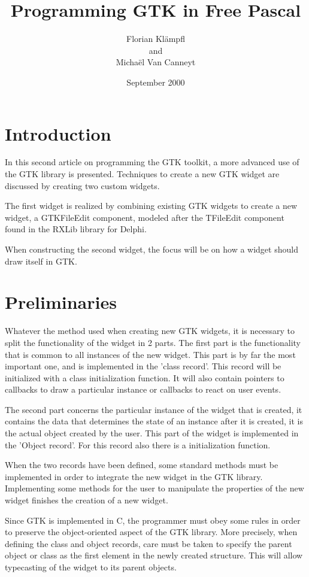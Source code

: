 \documentclass[10pt]{article}
\begin{document}
\title{Programming GTK in Free Pascal}
\author{Florian Kl\"ampfl\\and\\Micha\"el Van Canneyt}
\date{September 2000}
\maketitle
\section{Introduction}
In this second article on programming the GTK toolkit, a more advanced use
of the GTK library is presented. Techniques to create a new GTK widget
are discussed by creating two custom widgets. 

The first widget is realized by combining existing GTK widgets to create 
a new widget, a GTKFileEdit component, modeled after the TFileEdit component
found in the RXLib library for Delphi.

When constructing the second widget, the focus will be on how a widget
should draw itself in GTK.

\section{Preliminaries}
Whatever the method used when creating new GTK widgets, it is necessary to 
split the functionality of the widget in 2 parts. 
The first part is the functionality that is common to all instances of the 
new widget. This part is by far the most important one, and is implemented 
in the 'class record'. This record will be initialized with a class 
initialization function. It will also contain pointers to callbacks to
draw a particular instance or callbacks to react on user events.

The second part concerns the particular instance of the widget that is 
created, it contains the data that determines the state of an instance
after it is created, it is the actual object created by the user. This 
part of the widget is implemented in the 'Object record'. For this record
also there is a initialization function.

When the two records have been defined, some standard methods must be 
implemented in order to integrate the new widget in the GTK library. 
Implementing some methods for the user to manipulate the properties 
of the new widget finishes the creation of a new widget.

Since GTK is implemented in C, the programmer must obey some rules in order
to preserve the object-oriented aspect of the GTK library. More precisely,
when defining the class and object records, care must be taken to specify 
the parent object or class as the first element in the newly created structure. This
will allow typecasting of the widget to its parent objects.
\end{document}
